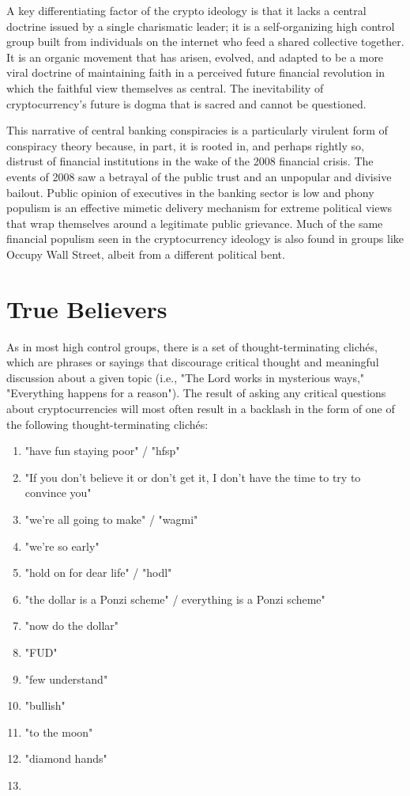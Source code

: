 A key differentiating factor of the crypto ideology is that it lacks a central
doctrine issued by a single charismatic leader; it is a self-organizing high
control group built from individuals on the internet who feed a shared
collective together. It is an organic movement that has arisen, evolved, and
adapted to be a more viral doctrine of maintaining faith in a perceived future
financial revolution in which the faithful view themselves as central. The
inevitability of cryptocurrency's future is dogma that is sacred and cannot be
questioned.


This narrative of central banking conspiracies is a particularly virulent form
of conspiracy theory because, in part, it is rooted in, and perhaps rightly so,
distrust of financial institutions in the wake of the 2008 financial crisis. The
events of 2008 saw a betrayal of the public trust and an unpopular and divisive
bailout. Public opinion of executives in the banking sector is low and phony
populism is an effective mimetic delivery mechanism for extreme political views
that wrap themselves around a legitimate public grievance.
\cite{varoufakis_yanis_2022} Much of the same financial populism seen in the
cryptocurrency ideology is also found in groups like Occupy Wall Street, albeit
from a different political bent.

\section{True Believers}

As in most high control groups, there is a set of thought-terminating clichés,
which are phrases or sayings that discourage critical thought and meaningful
discussion about a given topic \cite{montell_cultish_2021} (i.e., "The Lord
works in mysterious ways," "Everything happens for a reason"). The result of
asking any critical questions about cryptocurrencies will most often result in a
backlash in the form of one of the following thought-terminating clichés:

\begin{enumerate}
  \item "have fun staying poor" / "hfsp"
  \item "If you don't believe it or don't get it, I don't have the time to try to convince you"
  \item "we're all going to make" / "wagmi"
  \item "we're so early"
  \item "hold on for dear life" / "hodl"
  \item "the dollar is a Ponzi scheme" / everything is a Ponzi scheme"
  \item "now do the dollar"
  \item "FUD"
  \item "few understand"
  \item "bullish"
  \item "to the moon"
  \item "diamond hands"
  \item 🤡
\end{enumerate}

